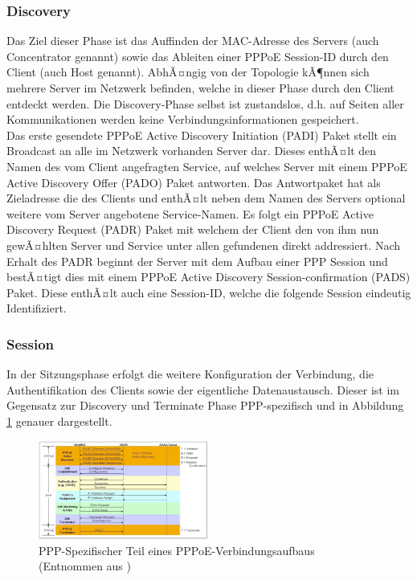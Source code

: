 \documentclass[journal]{IEEEtran}
\begin{document}
\subsubsection{Discovery}
Das Ziel dieser Phase ist das Auffinden der MAC-Adresse des Servers (auch Concentrator genannt)
sowie das Ableiten einer PPPoE Session-ID durch den Client (auch Host genannt).
AbhÃ¤ngig von der Topologie kÃ¶nnen sich mehrere Server im Netzwerk befinden, welche in
dieser Phase durch den Client entdeckt werden. Die Discovery-Phase selbst ist zustandslos, d.h.
auf Seiten aller Kommunikationen werden keine Verbindungsinformationen gespeichert.\\
Das erste gesendete PPPoE Active Discovery Initiation (PADI) Paket stellt ein Broadcast
an alle im Netzwerk vorhanden Server dar. Dieses enthÃ¤lt den Namen des vom Client
angefragten Service, auf welches Server mit einem
PPPoE Active Discovery Offer (PADO) Paket antworten. Das Antwortpaket
hat als Zieladresse die des Clients und enthÃ¤lt neben dem Namen des Servers optional
weitere vom Server angebotene Service-Namen. Es folgt ein PPPoE Active Discovery Request (PADR) Paket
mit welchem der Client den von ihm nun gewÃ¤hlten Server und Service unter allen
gefundenen direkt addressiert. Nach Erhalt des PADR beginnt der Server mit dem Aufbau
einer PPP Session und bestÃ¤tigt dies mit einem PPPoE Active Discovery Session-confirmation (PADS) Paket.
Diese enthÃ¤lt auch eine Session-ID, welche die folgende Session eindeutig Identifiziert.
\subsubsection{Session}
In der Sitzungsphase erfolgt die weitere Konfiguration der Verbindung, die Authentifikation des
Clients sowie der eigentliche Datenaustausch. Dieser ist im Gegensatz zur Discovery und Terminate
Phase PPP-spezifisch und in Abbildung \ref{fig:PPPoEsequenz2} genauer dargestellt.
%
\begin{figure}[h!]
 \centering
  \includegraphics[width=0.5\textwidth]{img/pppoe_sequenz2.jpg}
 \caption{PPP-Spezifischer Teil eines PPPoE-Verbindungsaufbaus (Entnommen aus \cite{pppoesequenz2})}
 \label{fig:PPPoEsequenz2}
\end{figure}
% 
\end{document}
